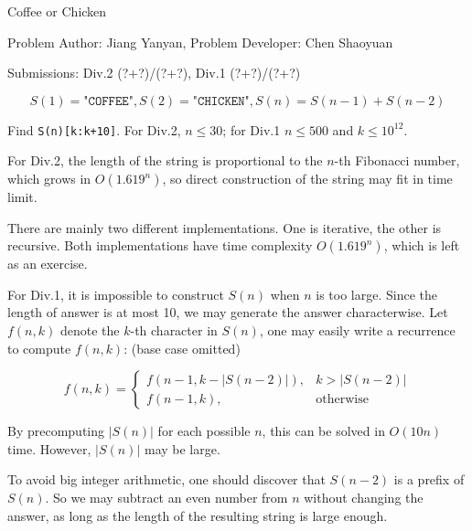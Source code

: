 \begin{Solution}{Coffee or Chicken}

\begin{frame}{\ProblemName}

\small Problem Author: Jiang Yanyan, Problem Developer: Chen Shaoyuan \par 

\small Submissions: Div.2 (?+?)/(?+?), Div.1 (?+?)/(?+?) 

$$S(1) = \texttt{"COFFEE"}, S(2) = \texttt{"CHICKEN"}, S(n) = S(n-1) + S(n-2)$$

Find \texttt{S(n)[k:k+10]}. For Div.2, $n \leq 30$; for Div.1 $n \leq 500$ and $k \leq 10^{12}$.

\pause

For Div.2, the length of the string is proportional to the $n$-th Fibonacci number, which grows in $O(1.619^n)$, so direct construction of the string may fit in time limit. 

There are mainly two different implementations. One is iterative, the other is recursive. Both implementations have time complexity $O(1.619^n)$, which is left as an exercise. 

\end{frame}

\begin{frame}{\ProblemName}

For Div.1, it is impossible to construct $S(n)$ when $n$ is too large. Since the length of answer is at most 10, we may generate the answer characterwise. Let $f(n, k)$ denote the $k$-th character in $S(n)$, one may easily write a recurrence to compute $f(n, k)$: (base case omitted)

$$ f(n, k) = \begin{cases}
f(n-1, k - |S(n-2)|), & k > |S(n-2)| \\
f(n-1, k), & \text{otherwise}
\end{cases} $$

\pause

By precomputing $|S(n)|$ for each possible $n$, this can be solved in $O(10n)$ time. However, $|S(n)|$ may be large.

\pause

To avoid big integer arithmetic, one should discover that $S(n-2)$ is a prefix of $S(n)$. So we may subtract an even number from $n$ without changing the answer, as long as the length of the resulting string is large enough.

\end{frame}

\end{Solution}
